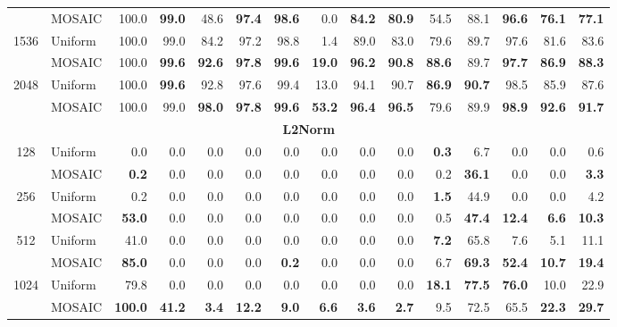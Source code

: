 \begin{table}[tp]
\begin{tabular}{@{} c l rrrrrrrrrrrrr @{}}
     & MOSAIC & 100.0 & \textbf{99.0} & 48.6 & \textbf{97.4} & \textbf{98.6} & 0.0 & \textbf{84.2} & \textbf{80.9} & 54.5 & 88.1 & \textbf{96.6} & \textbf{76.1} & \textbf{77.1} \\
    \cmidrule(l){1-15}
    \multirow{2}{*}{1536} & Uniform & 100.0 & 99.0 & 84.2 & 97.2 & 98.8 & 1.4 & 89.0 & 83.0 & 79.6 & 89.7 & 97.6 & 81.6 & 83.6 \\
     & MOSAIC & 100.0 & \textbf{99.6} & \textbf{92.6} & \textbf{97.8} & \textbf{99.6} & \textbf{19.0} & \textbf{96.2} & \textbf{90.8} & \textbf{88.6} & 89.7 & \textbf{97.7} & \textbf{86.9} & \textbf{88.3} \\
    \cmidrule(l){1-15}
    \multirow{2}{*}{2048} & Uniform & 100.0 & \textbf{99.6} & 92.8 & 97.6 & 99.4 & 13.0 & 94.1 & 90.7 & \textbf{86.9} & \textbf{90.7} & 98.5 & 85.9 & 87.6 \\
     & MOSAIC & 100.0 & 99.0 & \textbf{98.0} & \textbf{97.8} & \textbf{99.6} & \textbf{53.2} & \textbf{96.4} & \textbf{96.5} & 79.6 & 89.9 & \textbf{98.9} & \textbf{92.6} & \textbf{91.7} \\
    \midrule
    \multicolumn{15}{c}{\textbf{L2Norm}} \\
    \midrule
    \multirow{2}{*}{128} & Uniform & 0.0 & 0.0 & 0.0 & 0.0 & 0.0 & 0.0 & 0.0 & 0.0 & \textbf{0.3} & 6.7 & 0.0 & 0.0 & 0.6 \\
     & MOSAIC & \textbf{0.2} & 0.0 & 0.0 & 0.0 & 0.0 & 0.0 & 0.0 & 0.0 & 0.2 & \textbf{36.1} & 0.0 & 0.0 & \textbf{3.3} \\
    \cmidrule(l){1-15}
    \multirow{2}{*}{256} & Uniform & 0.2 & 0.0 & 0.0 & 0.0 & 0.0 & 0.0 & 0.0 & 0.0 & \textbf{1.5} & 44.9 & 0.0 & 0.0 & 4.2 \\
     & MOSAIC & \textbf{53.0} & 0.0 & 0.0 & 0.0 & 0.0 & 0.0 & 0.0 & 0.0 & 0.5 & \textbf{47.4} & \textbf{12.4} & \textbf{6.6} & \textbf{10.3} \\
    \cmidrule(l){1-15}
    \multirow{2}{*}{512} & Uniform & 41.0 & 0.0 & 0.0 & 0.0 & 0.0 & 0.0 & 0.0 & 0.0 & \textbf{7.2} & 65.8 & 7.6 & 5.1 & 11.1 \\
     & MOSAIC & \textbf{85.0} & 0.0 & 0.0 & 0.0 & \textbf{0.2} & 0.0 & 0.0 & 0.0 & 6.7 & \textbf{69.3} & \textbf{52.4} & \textbf{10.7} & \textbf{19.4} \\
    \cmidrule(l){1-15}
    \multirow{2}{*}{1024} & Uniform & 79.8 & 0.0 & 0.0 & 0.0 & 0.0 & 0.0 & 0.0 & 0.0 & \textbf{18.1} & \textbf{77.5} & \textbf{76.0} & 10.0 & 22.9 \\
     & MOSAIC & \textbf{100.0} & \textbf{41.2} & \textbf{3.4} & \textbf{12.2} & \textbf{9.0} & \textbf{6.6} & \textbf{3.6} & \textbf{2.7} & 9.5 & 72.5 & 65.5 & \textbf{22.3} & \textbf{29.7} \\

\end{tabular}
\end{table}
